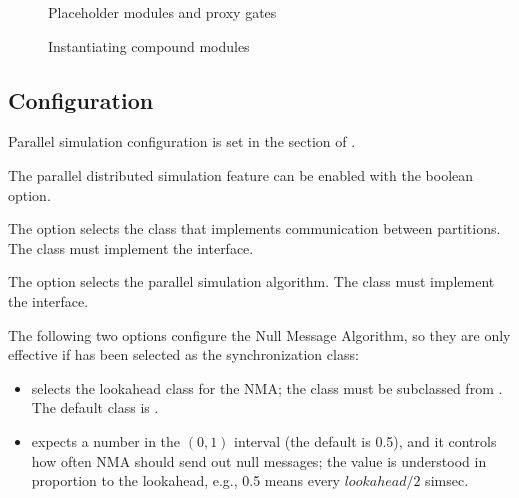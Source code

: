 \begin{figure}[htbp]
  \begin{center}
    
    \caption{Placeholder modules and proxy gates}
    \label{fig:plach}
  \end{center}
\end{figure}

\begin{figure}[htbp]
  \begin{center}
    
    \caption{Instantiating compound modules}
    \label{fig:inst}
  \end{center}
\end{figure}



\subsection{Configuration}
\label{sec:parallel-exec:configuration}

Parallel simulation configuration is set in the \ttt{[General]} section of .

The parallel distributed simulation feature can be enabled with the
 boolean option.

The  option selects the class that implements
communication between partitions. The class must implement the
 interface.


The  option selects the parallel
simulation algorithm. The class must implement the  interface.


The following two options configure the Null Message Algorithm, so
they are only effective if  has been selected
as the synchronization class:

\begin{itemize}
  \item {}
    selects the lookahead class for the NMA; the class must be subclassed
    from . The default class is .

  \item {} expects a number
    in the $(0,1)$ interval (the default is 0.5), and it controls how often
    NMA should send out null messages; the value is understood in proportion
    to the lookahead, e.g., 0.5 means every $lookahead/2$ simsec.
\end{itemize}

